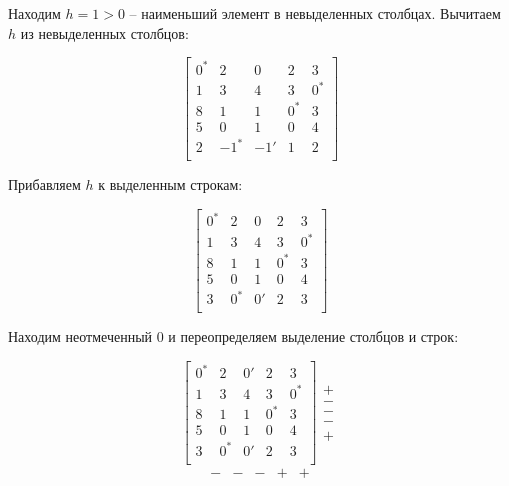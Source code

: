 \documentclass[a4paper,14pt]{article}
\begin{document}
Находим $h=1>0$ -- наименьший элемент в невыделенных столбцах. Вычитаем $h$ из невыделенных столбцов:

\begin{equation}
\begin{bmatrix}
0^* &	2  & 	0   &	2   &	3 	\\ 
1  &	3  & 	4   &	3   &	0^* 	\\
8  &	1  & 	1   &	0^*  & 	3 	\\
5  & 	0  & 	1   &	0   &	4 	\\
2  &   -1^* &  -1'  &	1   &	2 	\\
\end{bmatrix}
\end{equation}

\newpage
Прибавляем $h$ к выделенным строкам:

\begin{equation}
\begin{bmatrix}
0^* &	2  & 	0   &	2   &	3 	\\ 
1  &	3  & 	4   &	3   &	0^* \\
8  &	1  & 	1   &	0^* & 	3 	\\
5  & 	0  & 	1   &	0   &	4 	\\
3  &	0^*  & 	0'  &	2   &	3 	\\
\end{bmatrix}
\end{equation}

Находим неотмеченный 0 и переопределяем выделение столбцов и строк:

\begin{equation}
\begin{bmatrix}
0^* &	2  & 	0'   &	2   &	3 	\\ 
1  &	3  & 	4   &	3   &	0^* \\
8  &	1  & 	1   &	0^* & 	3 	\\
5  & 	0  & 	1   &	0   &	4 	\\
3  &	0^*  & 	0'  &	2   &	3 	\\
\end{bmatrix}
\begin{matrix}
+ \\
- \\
- \\
- \\
+
\end{matrix}
\end{equation}
\begin{equation}
\begin{matrix}
- & - & - & + & +
\end{matrix}
\end{equation}
\end{document}
